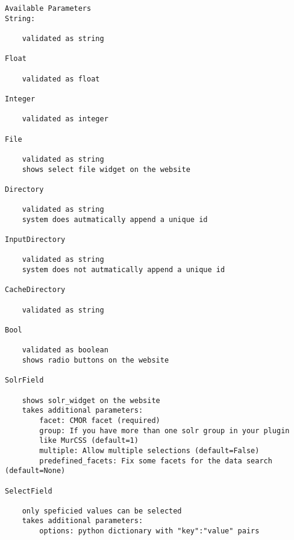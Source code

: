 \documentclass[a4paper,11pt]{ltxdoc}
\begin{document}
\begin{lstlisting}
Available Parameters
String:

    validated as string

Float

    validated as float

Integer

    validated as integer

File

    validated as string
    shows select file widget on the website

Directory

    validated as string
    system does autmatically append a unique id

InputDirectory

    validated as string
    system does not autmatically append a unique id

CacheDirectory

    validated as string

Bool

    validated as boolean
    shows radio buttons on the website

SolrField

    shows solr_widget on the website
    takes additional parameters:
        facet: CMOR facet (required)
        group: If you have more than one solr group in your plugin 
		like MurCSS (default=1)
        multiple: Allow multiple selections (default=False)
        predefined_facets: Fix some facets for the data search (default=None)

SelectField

    only speficied values can be selected
    takes additional parameters:
        options: python dictionary with "key":"value" pairs
\end{lstlisting}
\end{document}
